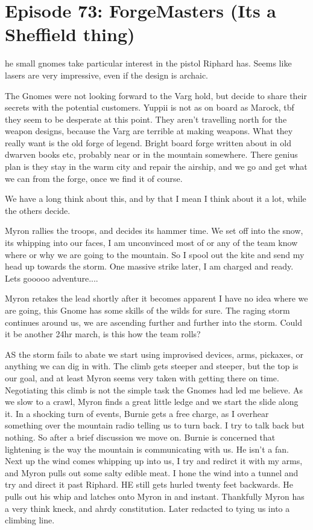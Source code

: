 \section{Episode 73: ForgeMasters (Its a Sheffield thing)}

\medskip

he small gnomes take particular interest in the pistol Riphard has. Seems like lasers are very impressive, even if the design is archaic.\medskip

The Gnomes were not looking forward to the Varg hold, but decide to share their secrets with the potential customers. Yuppii is not as on board as Marock, tbf they seem to be desperate at this point. They aren't travelling north for the weapon designs, because the Varg are terrible at making weapons. What they really want is the old forge of legend. Bright board forge written about in old dwarven books etc, probably near or in the mountain somewhere. There genius plan is they stay in the warm city and repair the airship, and we go and get what we can from the forge, once we find it of course.\medskip

We have a long think about this, and by that I mean I think about it a lot, while the others decide.\medskip

Myron rallies the troops, and decides its hammer time. We set off into the snow, its whipping into our faces, I am unconvinced most of or any of the team know where or why we are going to the mountain. So I spool out the kite and send my head up towards the storm. One massive strike later, I am charged and ready. Lets gooooo adventure....\medskip

Myron retakes the lead shortly after it becomes apparent I have no idea where we are going, this Gnome has some skills of the wilds for sure. The raging storm continues around us, we are ascending further and further into the storm. Could it be another 24hr march, is this how the team rolls?\medskip

AS the storm fails to abate we start using improvised devices, arms, pickaxes, or anything we can dig in with. The climb gets steeper and steeper, but the top is our goal, and at least Myron seems very taken with getting there on time. Negotiating this climb is not the simple task the Gnomes had led me believe. As we slow to a crawl, Myron finds a great little ledge and we start the slide along it. In a shocking turn of events, Burnie gets a free charge, as I overhear something over the mountain radio telling us to turn back. I try to talk back but nothing. So after a brief discussion we move on. Burnie is concerned that lightening is the way the mountain is communicating with us. He isn't a fan. Next up the wind comes whipping up into us, I try and redirct it with my arms, and Myron pulls out some salty edible meat. I hone the wind into a tunnel and try and direct it past Riphard. HE still gets hurled twenty feet backwards. He pulls out his whip and latches onto Myron in and instant. Thankfully Myron has a very think kneck, and ahrdy constitution. Later redacted to tying us into a climbing line.\medskip

